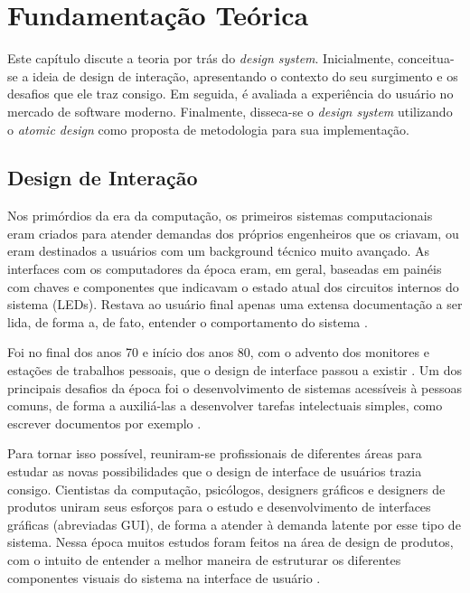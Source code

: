 
\chapter{Fundamentação Teórica}
\label{chap:fundamentacaoTeorica}

Este capítulo discute a teoria por trás do \textit{design system}. Inicialmente, conceitua-se a ideia de design de interação, apresentando o contexto do seu surgimento e os desafios que ele traz consigo. Em seguida, é avaliada a experiência do usuário no mercado de software moderno. Finalmente, disseca-se o \textit{design system} utilizando o \textit{atomic design} como proposta de metodologia para sua implementação.

\section{Design de Interação}
\label{sec:designInteracao}

Nos primórdios da era da computação, os primeiros sistemas computacionais eram criados para atender demandas dos próprios engenheiros que os criavam, ou eram destinados a usuários com um background técnico muito avançado. As interfaces com os computadores da época eram, em geral, baseadas em painéis com chaves e componentes que indicavam o estado atual dos circuitos internos do sistema (LEDs). Restava ao usuário final apenas uma extensa documentação a ser lida, de forma a, de fato, entender o comportamento do sistema \cite{preece2005design}.

Foi no final dos anos 70 e início dos anos 80, com o advento dos monitores e estações de trabalhos pessoais, que o design de interface passou a existir \cite{grudin1990computer}. Um dos principais desafios da época foi o desenvolvimento de sistemas acessíveis à pessoas comuns, de forma a auxiliá-las a desenvolver tarefas intelectuais simples, como escrever documentos por exemplo \cite{preece2005design}.

Para tornar isso possível, reuniram-se profissionais de diferentes áreas para estudar as novas possibilidades que o design de interface de usuários trazia consigo. Cientistas da computação, psicólogos, designers gráficos e designers de produtos uniram seus esforços para o estudo e desenvolvimento de interfaces gráficas (abreviadas GUI), de forma a atender à demanda latente por esse tipo de sistema. Nessa época muitos estudos foram feitos na área de design de produtos, com o intuito de entender a melhor maneira de estruturar os diferentes componentes visuais do sistema na interface de usuário \cite{preece2005design}.

